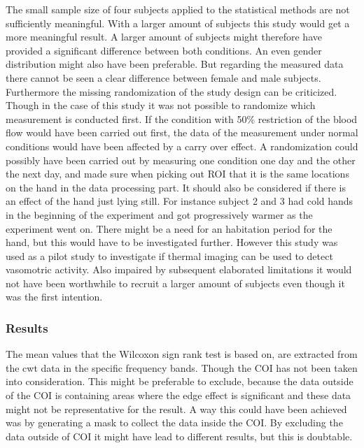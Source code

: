 The small sample size of four subjects applied to the statistical methods are not sufficiently meaningful. With a larger amount of subjects this study would get a more meaningful result. A larger amount of subjects might therefore have provided a significant difference between both conditions. An even gender distribution might also have been preferable. But regarding the measured data there cannot be seen a clear difference between female and male subjects.
Furthermore the missing randomization of the study design can be criticized. Though in the case of this study it was not possible to randomize which measurement is conducted first. If the condition with 50\% restriction of the blood flow would have been carried out first, the data of the measurement under normal conditions would have been affected by a carry over effect. A randomization could possibly have been carried out by measuring one condition one day and the other the next day, and made sure when picking out ROI that it is the same locations on the hand in the data processing part. It should also be considered if there is an effect of the hand just lying still. For instance subject 2 and 3 had cold hands in the beginning of the experiment and got progressively warmer as the experiment went on. There might be a need for an habitation period for the hand, but this would have to be investigated further. 
However this study was used as a pilot study to investigate if thermal imaging can be used to detect vasomotric activity. Also impaired by subsequent elaborated limitations it would not have been worthwhile to recruit a larger amount of subjects even though it was the first intention.

\subsubsection{Results}
The mean values that the Wilcoxon sign rank test is based on, are extracted from the cwt data in the specific frequency bands. Though the COI has not been taken into consideration. This might be preferable to exclude, because the data outside of the COI is containing areas where the edge effect is significant and these data might not be representative for the result. A way this could have been achieved was by generating a mask to collect the data inside the COI. By excluding the data outside of COI it might have lead to different results, but this is doubtable. 

